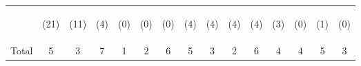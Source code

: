 \begin{tabular}{lcccccccccccccc}
 & \begin{footnotesize}(21)\end{footnotesize} & \begin{footnotesize}(11)\end{footnotesize} & \begin{footnotesize}(4)\end{footnotesize} & \begin{footnotesize}(0)\end{footnotesize} & \begin{footnotesize}(0)\end{footnotesize} & \begin{footnotesize}(0)\end{footnotesize} & \begin{footnotesize}(4)\end{footnotesize} & \begin{footnotesize}(4)\end{footnotesize} & \begin{footnotesize}(4)\end{footnotesize} & \begin{footnotesize}(4)\end{footnotesize} & \begin{footnotesize}(3)\end{footnotesize} & \begin{footnotesize}(0)\end{footnotesize} & \begin{footnotesize}(1)\end{footnotesize} & \begin{footnotesize}(0)\end{footnotesize}\\
\noalign{\smallskip}Total & 5 & 3 & 7 & 1 & 2 & 6 & 5 & 3 & 2 & 6 & 4 & 4 & 5 & 3\\

\end{tabular}
